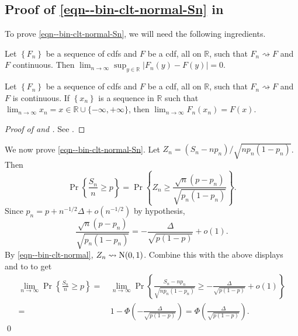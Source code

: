 \subsection{Proof of
\texorpdfstring{\eqref{eqn--bin-clt-normal-Sn}}{(\ref{eqn--bin-clt-normal-Sn})}
in \texorpdfstring{}{Theorem
\ref{thm--bin-clt-normal}}}
\label{sec--prf--eqn--bin-clt-normal-Sn}

To prove \eqref{eqn--bin-clt-normal-Sn}, we will need the following ingredients.

\begin{theorem}
\label{thm--polya}
Let \(\left\{ F_{n} \right\}\) be a sequence of cdfs and \(F\)
be a cdf, all on \(\mathbb{R}\), such that \(F_{n} \rightsquigarrow F\) and
\(F\) continuous.
Then \(\lim_{n \to \infty} \sup_{y \in \mathbb{R}} \left| F_{n} (y) - F (y)
\right| = 0\).
\end{theorem}

\begin{corollary}
\label{cor--polya}
Let \(\left\{ F_{n} \right\}\) be a sequence of cdfs and \(F\)
be a cdf, all on \(\mathbb{R}\), such that \(F_{n} \rightsquigarrow F\) and
\(F\) is continuous.
If \(\left\{ x_{n} \right\}\) is a sequence in \(\mathbb{R}\) such that
\(\lim_{n \to \infty} x_{n} = x \in \mathbb{R} \cup \{- \infty, + \infty\}\),
then \(\lim_{n \to \infty} F_{n} \left( x_{n} \right) = F (x)\).
\end{corollary}

\begin{proof}[Proof of  and ]
See .
\end{proof}

We now prove \eqref{eqn--bin-clt-normal-Sn}.
Let \(Z_{n} = \left( S_{n} - n p_{n} \right) / \sqrt{n p_{n} \left( 1 - p_{n}
\right)}\).
Then
\begin{equation*}
  \Pr \left\{ \frac{S_{n}}{n} \geq p \right\} = \Pr \left\{ Z_{n} \geq
  \frac{\sqrt{n} \left( p - p_{n} \right)}{\sqrt{p_{n} \left( 1 - p_{n}
  \right)}} \right\}.
\end{equation*}
Since \(p_{n} = p + n^{- 1 / 2} \Delta + o \left( n^{- 1 / 2} \right)\) by
hypothesis,
\begin{equation*}
  \frac{\sqrt{n} \left( p - p_{n} \right)}{\sqrt{p_{n} \left( 1
  - p_{n} \right)}} = - \frac{\Delta}{\sqrt{p (1 - p)}} + o (1).
\end{equation*}
By \eqref{eqn--bin-clt-normal}, \(Z_{n} \rightsquigarrow \mathrm{N} (0, 1)\).
Combine this with the above displays and  to 
to get
\begin{align*}
  \lim_{n \to \infty} \Pr \left\{ \frac{S_{n}}{n} \geq p \right\} =
  & \, \lim_{n \to \infty} \Pr \left\{ \frac{S_{n} - n p_{n}}{\sqrt{n p_{n}
  \left( 1 - p_{n} \right)}} \geq - \frac{\Delta}{\sqrt{p (1 - p)}} + o (1)
  \right\} \\
  =
  & \, 1 - \Phi \left( - \frac{\Delta}{\sqrt{p (1 - p)}} \right) = \Phi \left(
  \frac{\Delta}{\sqrt{p (1 - p)}} \right).
\end{align*}
\qed

